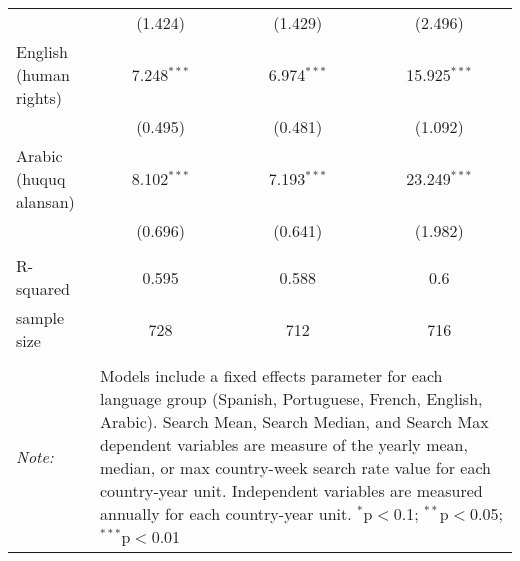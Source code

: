 \begin{table}[!htbp]
\begin{tabular}{@{\extracolsep{5pt}}lccc}
  & (1.424) & (1.429) & (2.496) \\ 
  English (human rights) & 7.248$^{***}$ & 6.974$^{***}$ & 15.925$^{***}$ \\ 
  & (0.495) & (0.481) & (1.092) \\ 
  Arabic (huquq alansan) & 8.102$^{***}$ & 7.193$^{***}$ & 23.249$^{***}$ \\ 
  & (0.696) & (0.641) & (1.982) \\ 
 \hline \\[-1.8ex] 
R-squared  & 0.595 & 0.588 & 0.6 \\ 
sample size  & 728 & 712 & 716 \\ 
\hline 
\hline \\[-1.8ex] 
\textit{Note:}  & \multicolumn{3}{l}{\parbox[t]{8cm}{Models include a fixed effects parameter for each language group (Spanish, Portuguese, French, English, Arabic). Search Mean, Search Median, and Search Max dependent variables are measure of the yearly mean, median, or max country-week search rate value for each country-year unit. Independent variables are measured annually for each country-year unit. $^{*}$p$<$0.1; $^{**}$p$<$0.05; $^{***}$p$<$0.01}} \\ 
\end{tabular} 
\end{table} 
